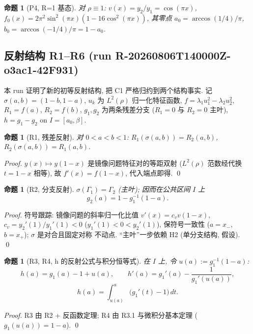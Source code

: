 \documentclass[UTF8]{ctexart}
\newtheorem{proposition}[theorem]{命题}
\begin{document}
\begin{proposition}[P4, R=1 基态]
对 $\rho\equiv1$: $v(x)=y_2/y_1=\cos(\pi x)$, $f_0(x)=2\pi^2\sin^2(\pi x)(1-16\cos^2(\pi x))$,
其零点 $a_0=\arccos(1/4)/\pi$, $b_0=\arccos(-1/4)/\pi=1-a_0$.
\end{proposition}


\subsection{反射结构 R1--R6 (run R-20260806T140000Z-o3ac1-42F931)}

本 run 证明了新的初等反射结构, 把 C1 严格归约到两个结构事实.
记 $\sigma(a,b)=(1-b,1-a)$, $u_k$ 为 $L^2(\rho)$ 归一化特征函数,
$f=\lambda_1u_1^2-\lambda_2u_2^2$, $R_1=f(a)$, $R_2=f(b)$,
$g_1,g_2$ 为两条残差分支 ($R_1=0$ 与 $R_2=0$ 主叶), $h=g_1-g_2$ on
$I=[a_0,\beta]$.

\begin{proposition}[R1, 残差反射]
对 $0<a<b<1$: $R_1(\sigma(a,b))=R_2(a,b)$, $R_2(\sigma(a,b))=R_1(a,b)$.
\end{proposition}
\begin{proof}
$y(x)\mapsto y(1-x)$ 是镜像问题特征对的等距双射 ($L^2(\rho)$ 范数经代换
$t=1-x$ 相等), 故 $f'(x)=f(1-x)$, 代入端点即得. \qed
\end{proof}

\begin{proposition}[R2, 分支反射]
$\sigma(\Gamma_1)=\Gamma_2$ (主叶); 因而在公共区间 $I$ 上
\begin{equation}
	g_2(a)=1-g_1^{-1}(1-a).
\end{equation}
\end{proposition}
\begin{proof}
符号跟踪: 镜像问题的斜率归一化比值 $v'(x)=c_vv(1-x)$, $c_v=y_2'(1)/y_1'(1)<0$
($y_1'(1)<0<y_2'(1)$), 保符号一致性 ($a=x_-$, $b=x_+$); $\sigma$ 是对合且固定对称
不动点. ``主叶''一步依赖 H2 (单分支结构, 假设). \qed
\end{proof}

\begin{proposition}[R3, R4, h 的反射公式与积分恒等式]
在 $I$ 上, 令 $u(a):=g_1^{-1}(1-a)$:
\begin{equation}
	h(a)=g_1(a)-1+u(a),\qquad h'(a)=g_1'(a)-\frac1{g_1'(u(a))},
\end{equation}
\begin{equation}
	h(a)=\int_{u(a)}^{a}\bigl(g_1'(t)-1\bigr)\,dt.
\end{equation}
\end{proposition}
\begin{proof}
R3 由 R2 + 反函数定理; R4 由 R3.1 与微积分基本定理 ($g_1(u(a))=1-a$). \qed
\end{proof}
\end{document}
